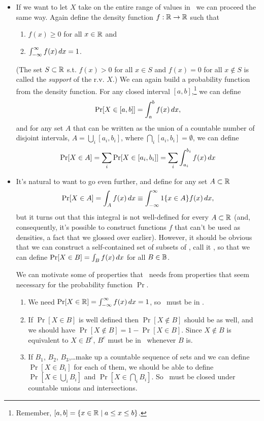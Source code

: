 \begin{itemize}[leftmargin=0pt]
\item If we want to let $X$ take on the entire range of values in \RR\
  we can proceed the same way.  Again define the density function $f:
  \mathbb{R} \to \mathbb{R}$ such that
  \begin{enumerate}
  \item $f(x) \geq 0$ for all $x \in \mathbb{R}$ and
  \item $\int_{-\infty}^\infty f(x) \,dx = 1$.
  \end{enumerate}
  (The set $S \subset \mathbb{R}$ s.t. $f(x) > 0$ for all $x \in S$ and $f(x) = 0$
  for all $x \notin S$ is called the \emph{support} of the r.v. $X$.)  We
  can again build a probability function from the density function.
  For any closed interval $[a, b]$,\footnote{Remember, $[a,b] = \{x \in
  \mathbb{R} \mid a \leq x \leq b\}$.} we can define
  \begin{equation*}
    \operatorname{Pr}[ X \in [a,b] ] = \int_a^b f(x) \,dx,
  \end{equation*}
  and for any set $A$ that can be written as the union of a countable
  number of disjoint intervals, $A = \bigcup_i [a_i, b_i]$, where
  $\bigcap_i [a_i, b_i] = \emptyset$, we can define
  \begin{equation*}
    \operatorname{Pr}[ X \in A ] = \sum_i \operatorname{Pr}[ X \in [a_i, b_i] ]
    = \sum_i \int_{a_i}^{b_i} f(x) \,dx
  \end{equation*}

\item It's natural to want to go even further, and define for any set
  $A \subset \mathbb{R}$
  \begin{equation*}
    \operatorname{Pr}[ X \in A ] = \int_A f(x) \,dx 
    \equiv \int_{-\infty}^\infty \operatorname{1}\{x \in A\} f(x) \,dx,
  \end{equation*}
  but it turns out that this integral is not well-defined for every $A
  \subset \mathbb{R}$ (and, consequently, it's possible to construct functions $f$
  that can't be used as densities, a fact that we glossed over
  earlier).  However, it should be obvious that we can construct a
  self-contained set of subsets of \RR, call it \BB, so that we can
  define $\operatorname{Pr}[X \in B] = \int_B f(x) \,dx$ for all $B \in \mathbb{B}$.

  We can motivate some of properties that \BB\ needs from properties
  that seem necessary for the probability function $\Pr$.

  \begin{enumerate}
  \item We need $\operatorname{Pr}[X \in \mathbb{R}] = \int_{-\infty}^\infty f(x) \,dx = 1$,
    so \RR\ must be in \BB.
  \item If $\Pr[X \in B]$ is well defined then $\Pr[X \notin B]$
    should be as well, and we should have $\Pr[X \notin B] = 1 - \Pr[X
    \in B]$.  Since $X \notin B$ is equivalent to $X \in B^c$, $B^c$
    must be in \BB\ whenever $B$ is.
  \item If $B_1$, $B_2$, $B_3$,\dots make up a countable sequence of
    sets and we can define $\Pr[X \in B_i]$ for each of them, we
    should be able to define $\Pr[X \in \bigcup_i B_i]$ and $\Pr[X \in
    \bigcap_i B_i]$.  So \BB\ must be closed under countable unions
    and intersections.
  \end{enumerate}


\end{itemize}
